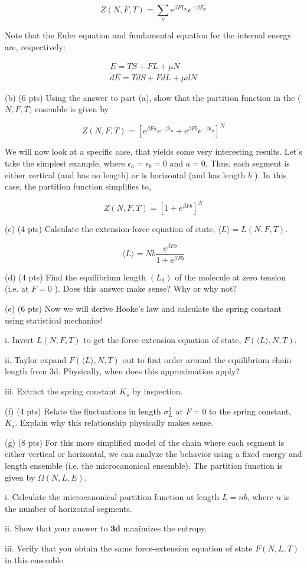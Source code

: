 \documentclass[10pt]{article}
\begin{document}
$$
Z(N, F, T)=\sum_{\nu} e^{\beta F L_{\nu}} e^{-\beta E_{\nu}}
$$

Note that the Euler equation and fundamental equation for the internal energy are, respectively:

$$
\begin{gathered}
E=T S+F L+\mu N \\
d E=T d S+F d L+\mu d N
\end{gathered}
$$

(b) (6 pts) Using the answer to part (a), show that the partition function in the ( $N, F, T)$ ensemble is given by

$$
Z(N, F, T)=\left[e^{\beta F a} e^{-\beta \epsilon_{a}}+e^{\beta F b} e^{-\beta \epsilon_{b}}\right]^{N}
$$

We will now look at a specific case, that yields some very interesting results. Let's take the simplest example, where $\epsilon_{a}=\epsilon_{b}=0$ and $a=0$. Thus, each segment is either vertical (and has no length) or is horizontal (and has length $b$ ). In this case, the partition function simplifies to,

$$
Z(N, F, T)=\left[1+e^{\beta F b}\right]^{N}
$$

(c) (4 pts) Calculate the extension-force equation of state, $\langle L\rangle=L(N, F, T)$.

$$
\langle L\rangle=N b \frac{e^{\beta F b}}{1+e^{\beta F b}}
$$

(d) (4 pts) Find the equilibrium length $\left(L_{0}\right)$ of the molecule at zero tension (i.e. at $F=0$ ). Does this answer make sense? Why or why not?

(e) (6 pts) Now we will derive Hooke's law and calculate the spring constant using statistical mechanics!

i. Invert $L(N, F, T)$ to get the force-extension equation of state, $F(\langle L\rangle, N, T)$.

ii. Taylor expand $F(\langle L\rangle, N, T)$ out to first order around the equilibrium chain length from 3d. Physically, when does this approximation apply?

iii. Extract the spring constant $K_{s}$ by inspection.

(f) (4 pts) Relate the fluctuations in length $\sigma_{L}^{2}$ at $F=0$ to the spring constant, $K_{s}$. Explain why this relationship physically makes sense.

(g) (8 pts) For this more simplified model of the chain where each segment is either vertical or horizontal, we can analyze the behavior using a fixed energy and length ensemble (i.e. the microcanonical ensemble). The partition function is given by $\Omega(N, L, E)$.

i. Calculate the microcanonical partition function at length $L=n b$, where $n$ is the number of horizontal segments.

ii. Show that your answer to $\mathbf{3 d}$ maximizes the entropy.

iii. Verify that you obtain the same force-extension equation of state $F(N, L, T)$ in this ensemble.
\end{document}
